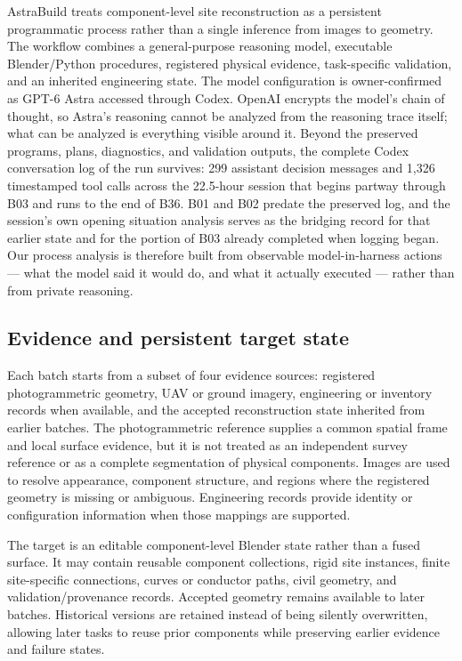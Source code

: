 \documentclass[10pt,a4paper]{article}
\begin{document}
AstraBuild treats component-level site reconstruction as a persistent
programmatic process rather than a single inference from images to
geometry. The workflow combines a general-purpose reasoning model,
executable Blender/Python procedures, registered physical evidence,
task-specific validation, and an inherited engineering state. The model
configuration is owner-confirmed as GPT-6 Astra accessed through Codex.
OpenAI encrypts the model's chain of thought, so Astra's reasoning
cannot be analyzed from the reasoning trace itself; what can be analyzed
is everything visible around it. Beyond the preserved programs, plans,
diagnostics, and validation outputs, the complete Codex conversation log
of the run survives: 299 assistant decision messages and 1,326
timestamped tool calls across the 22.5-hour session that begins partway
through B03 and runs to the end of B36. B01 and B02 predate the
preserved log, and the session's own opening situation analysis serves
as the bridging record for that earlier state and for the portion of B03
already completed when logging began. Our process analysis is therefore
built from observable model-in-harness actions --- what the model said
it would do, and what it actually executed --- rather than from private
reasoning.

\hypertarget{evidence-and-persistent-target-state}{%
\subsection{Evidence and persistent target
state}\label{evidence-and-persistent-target-state}}

Each batch starts from a subset of four evidence sources: registered
photogrammetric geometry, UAV or ground imagery, engineering or
inventory records when available, and the accepted reconstruction state
inherited from earlier batches. The photogrammetric reference supplies a
common spatial frame and local surface evidence, but it is not treated
as an independent survey reference or as a complete segmentation of
physical components. Images are used to resolve appearance, component
structure, and regions where the registered geometry is missing or
ambiguous. Engineering records provide identity or configuration
information when those mappings are supported.

The target is an editable component-level Blender state rather than a
fused surface. It may contain reusable component collections, rigid site
instances, finite site-specific connections, curves or conductor paths,
civil geometry, and validation/provenance records. Accepted geometry
remains available to later batches. Historical versions are retained
instead of being silently overwritten, allowing later tasks to reuse
prior components while preserving earlier evidence and failure states.
\end{document}
